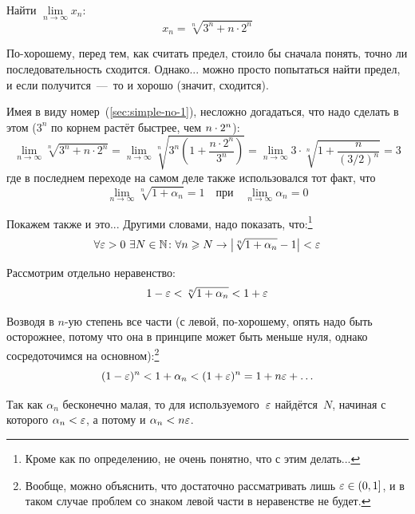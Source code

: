 \documentclass[a4paper,12pt]{article}
\begin{document}
  Найти $\lim\limits_{n \to \infty} x_n$:
  \[
    x_n = \sqrt[n]{3^n + n \cdot 2^n}
  \]
  
  \begin{solution}
    По-хорошему, перед тем, как считать предел, стоило бы сначала понять, точно ли последовательность сходится.
    Однако... можно просто попытаться найти предел, и если получится~---~то и хорошо (значит, сходится).
    
    Имея в виду номер~(\ref{sec:simple-no-1}), несложно догадаться, что надо сделать в этом ($3^n$ по корнем растёт быстрее, чем $n \hm\cdot 2^n$):
    \[
      \lim\limits_{n \to \infty} \sqrt[n]{3^n + n \cdot 2^n}
        = \lim\limits_{n \to \infty} \sqrt[n]{3^n \left(1 + \frac{n \cdot 2^n}{3^n}\right)}
        = \lim\limits_{n \to \infty} 3 \cdot \sqrt[n]{1 + \frac{n}{(3/2)^n}}
        = 3
    \]
    где в последнем переходе на самом деле также использовался тот факт, что
    \[
      \lim_{n \to \infty} \sqrt[n]{1 + \alpha_n} = 1\quad \mbox{при}\quad \lim_{n \to \infty} \alpha_n = 0
    \]
    
    Покажем также и это...
    Другими словами, надо показать, что:\footnote{
      Кроме как по определению, не очень понятно, что с этим делать...
    }
    \[
      \forall \varepsilon > 0\ \exists N \in \mathbb N\colon \forall n \geqslant N \to \left|\sqrt[n]{1 + \alpha_n} - 1\right| < \varepsilon
    \]
    
    Рассмотрим отдельно неравенство:
    \[
      1 - \varepsilon < \sqrt[n]{1 + \alpha_n} < 1 + \varepsilon
    \]
    
    Возводя в $n$-ую степень все части (с левой, по-хорошему, опять надо быть осторожнее, потому что она в принципе может быть меньше нуля, однако сосредоточимся на основном):\footnote{
      Вообще, можно объяснить, что достаточно рассматривать лишь $\varepsilon \in (0, 1]$, и в таком случае проблем со знаком левой части в неравенстве не будет.
    }
    \[
      (1 - \varepsilon)^n < 1 + \alpha_n < (1 + \varepsilon)^n = 1 + n \varepsilon + \ldots
    \]
    
    Так как $\alpha_n$ бесконечно малая, то для используемого~$\varepsilon$ найдётся~$N$, начиная с которого $\alpha_n \hm< \eps$, а потому и $\alpha_n \hm< n \eps$.
  \end{solution}
  
\end{document}
